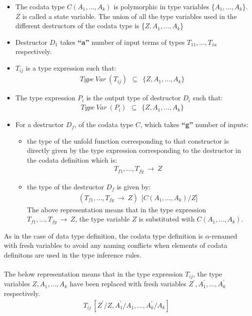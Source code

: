 \documentclass[11pt]{article}
\begin{document}
\begin{itemize}
  \item The codata type ${C(A_1,\ldots,A_k)}$ is polymorphic in type variables \{${A_1,\ldots,A_k}$\}. ${Z}$ is called a state variable. The union of all the type variables used in the different destructors of the codata type is \{${Z,A_1,\ldots,A_k}$\}
  \item Destructor ${D_1}$ takes {\bf ``a''} number of input terms of types ${T_{11},\ldots,T_{1a}}$ respectively.
  \item ${T_{ij}}$ is a type expression such that:
\begin{align*}
Type~Var~(T_{ij})~~\subseteq~~ \{Z,A_1,\ldots,A_k\}
\end{align*}
\item The type expression ${P_i}$ is the output type of destructor ${D_i}$ such that:
\begin{align*}
Type~Var~(P_{i})~~\subseteq~~ \{Z,A_1,\ldots,A_k\}
\end{align*}

\item For a destructor ${D_f}$, of the codata type ${C}$, which takes {\bf ``g''} number of inputs:
\begin{itemize}
  \item the type of the {\sf unfold} function corresponding to that constructor is directly given by the type expression corresponding to the destructor in the codata definition which is:
  \begin{align*}
    T_{f1},\ldots,T_{fg}~\to~Z
  \end{align*}
  \item the type of the destructor ${D_f}$ is given by:
  \begin{align*}
    (T_{f1},\ldots,T_{fg}~\to~Z)~~\Big[C(A_1,\ldots,A_k)/Z\Big]
  \end{align*}
  The above representation means that in the type expression ${T_{f1},\ldots,T_{fg}~\to~Z}$, the type variable ${Z}$ is substituted with ${C(A_1,\ldots,A_k)}$.
\end{itemize}
\end{itemize}
As in the case of data type definition, the codata type definition is $\alpha$-renamed with fresh variables to avoid any naming conflicts when elements of codata definitons are used in the type inference rules.
~~\\~~\\ 
The below representation means that in the type expression ${T_{ij}}$, the type variables ${Z,A_1,\ldots,A_k}$ have been replaced with fresh variables ${Z^\prime,A_1^\prime,\ldots,A_k^\prime}$ respectively.
\begin{align*}
T_{ij}~[Z^\prime/Z,A_1^{\prime}/A_1,\ldots,A_k^{\prime}/A_k]
\end{align*}
\end{document}

